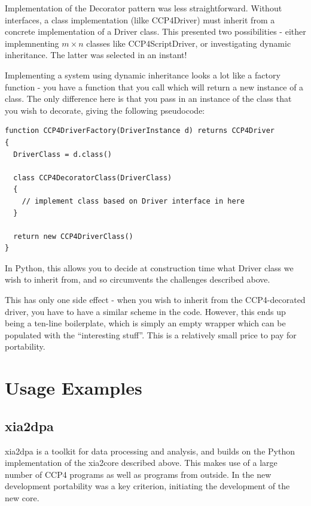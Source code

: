 \documentclass[a4paper, 11pt]{article}
\begin{document}
Implementation of the Decorator pattern was less straightforward. Without 
interfaces, a class implementation (lilke CCP4Driver) must inherit from a 
concrete implementation of a Driver class. This presented two possibilities -
either implemnenting $m \times n$ classes like CCP4ScriptDriver, or 
investigating dynamic inheritance. The latter was selected in an instant!

Implementing a system using dynamic inheritance looks a lot like a 
factory function - you have a function that you call which will return 
a new instance of a class. The only difference here is that you pass in 
an instance of the class that you wish to decorate, giving the following
pseudocode:

\begin{verbatim}
function CCP4DriverFactory(DriverInstance d) returns CCP4Driver
{
  DriverClass = d.class()

  class CCP4DecoratorClass(DriverClass)
  {
    // implement class based on Driver interface in here
  }

  return new CCP4DriverClass()
}
\end{verbatim}

In Python, this allows you to decide at construction time what Driver
class we wish to inherit from, and so circumvents the challenges described
above.

This has only one side effect - when you wish to inherit from the
CCP4-decorated driver, you have to have a similar scheme in the code.
However, this ends up being a ten-line boilerplate, which is simply
an empty wrapper which can be populated with the ``interesting stuff''.
This is a relatively small price to pay for portability.

\section{Usage Examples}

\subsection{xia2dpa}

xia2dpa is a toolkit for data processing and analysis, and builds
on the Python implementation of the xia2core described above. This makes 
use of a large number of CCP4 programs as well as programs from outside.
In the new development portability was a key criterion, initiating the 
development of the new core.
\end{document}
